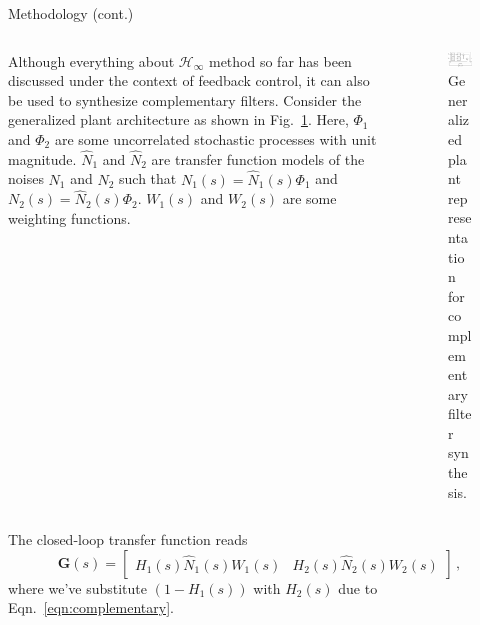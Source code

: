 \documentclass{beamer}
\begin{document}
\begin{frame}[t]
\begin{columns}[t]
\begin{column}{0.32\linewidth}
\begin{block}{Methodology (cont.)}
			\begin{columns}[t, onlytextwidth]
				\begin{column}{0.475\textwidth}
					Although everything about $\mathcal{H}_\infty$ method so far has been discussed under the context of feedback control, it can also be used to synthesize complementary filters.
					Consider the generalized plant architecture as shown in Fig.~\ref{fig:generlized_plant_complementary_filter}.
					Here, $\Phi_1$ and $\Phi_2$ are some uncorrelated stochastic processes with unit magnitude.
					$\hat{N}_1$ and $\hat{N}_2$ are transfer function models of the noises $N_1$ and $N_2$ such that
					$N_1(s) = \hat{N}_1(s)\Phi_1$ and $N_2(s) = \hat{N}_2(s)\Phi_2$.
					$W_1(s)$ and $W_2(s)$ are some weighting functions.
				\end{column}
				\begin{column}{0.5\textwidth}
					\begin{figure}[!h]
						\centering
						\includegraphics[width=1\linewidth]{generalized_plant_complementary_filter}
						\caption{Generalized plant representation for complementary filter synthesis.}
						\label{fig:generlized_plant_complementary_filter}
					\end{figure}
				\end{column}
			\end{columns}
		
			\medskip
			
			The closed-loop transfer function reads
			\begin{equation}
				\mathbf{G}(s) = \begin{bmatrix}H_1(s)\hat{N}_1(s)W_1(s) & H_2(s)\hat{N}_2(s)W_2(s)\end{bmatrix}\,,
			\end{equation}
			where we've substitute $(1-H_1(s))$ with $H_2(s)$ due to Eqn.~\eqref{eqn:complementary}.
			\end{block}
			

\end{column}
\end{columns}
\end{frame}
\end{document}
